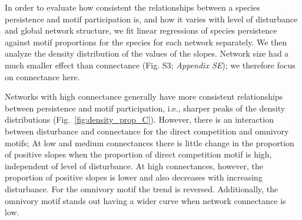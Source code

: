 \documentclass[12pt]{article}
\begin{document}
\begin{spacing}{2.0}
            In order to evaluate how consistent the relationships between a species persistence and motif participation is, and how it varies with  level of disturbance and global network structure, we fit linear regressions of species persistence against motif proportions for the species for each network separately. We then analyze the density distribution of the values of the slopes. Network size had a much smaller effect than connectance (Fig. S3; \emph{Appendix SE}); we therefore focus on connectance here. 
            
            Networks with high connectance generally have more consistent relationships between persistence and motif participation, i.e., sharper peaks of the density distributions (Fig.~\ref{fig:density_prop_C}). However, there is an interaction between disturbance and connectance for the direct competition and omnivory motifs; At low and medium connectances there is little change in the proportion of positive slopes when the proportion of  direct competition motif is high, independent of level of disturbance. At high connectances, however, the proportion of positive slopes is lower and also decreases with increasing disturbance. For the omnivory motif the trend is reversed. Additionally, the omnivory motif stands out having a wider curve when network connectance is low.



\end{spacing}
\end{document}
